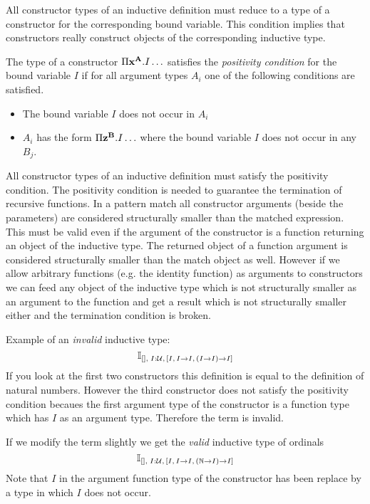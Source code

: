 All constructor types of an inductive definition must reduce to a type of a
constructor for the corresponding bound variable. This condition implies that
constructors really construct objects of the corresponding inductive type.


\begin{definition}
  The type of a constructor $\Pi \mathbf{x}^{\mathbf{A}}. I \ldots$ satisfies the
  \emph{positivity condition} for the bound variable $I$ if for all argument
  types $A_i$ one of the following conditions are satisfied.
  \begin{itemize}
  \item The bound variable $I$ does not occur in $A_i$

  \item $A_i$ has the form $\Pi \mathbf{z}^{\mathbf{B}} . I \ldots$ where the bound
    variable $I$ does not occur in any $B_j$.
  \end{itemize}
\end{definition}

All constructor types of an inductive definition must satisfy the positivity
condition. The positivity condition is needed to guarantee the termination of
recursive functions. In a pattern match all constructor arguments (beside the
parameters) are considered structurally smaller than the matched
expression. This must be valid even if the argument of the constructor is a
function returning an object of the inductive type. The returned object of a
function argument is considered structurally smaller than the match object as
well. However if we allow arbitrary functions (e.g. the identity function) as
arguments to constructors we can feed any object of the inductive type which
is not structurally smaller as an argument to the function and get a result
which is not structurally smaller either and the termination condition is
broken.

Example of an \emph{invalid} inductive type:
$$
\mathbb{I}_{[],\; I:{\cal{U}},\, [I,\, I \to I, \, (I \to I) \to I]}
$$
If you look at the first two constructors this definition is equal to the
definition of natural numbers. However the third constructor does not satisfy
the positivity condition becaues the first argument type of the constructor is
a function type which has $I$ as an argument type. Therefore the term is
invalid.

If we modify the term slightly we get the \emph{valid} inductive type of
ordinals
$$
\mathbb{I}_{[],\; I:{\cal{U}},\, [I,\, I \to I, \, ({\mathbb{N}} \to I) \to I]}
$$
Note that $I$ in the argument function type of the constructor has been
replace by a type in which $I$ does not occur.




